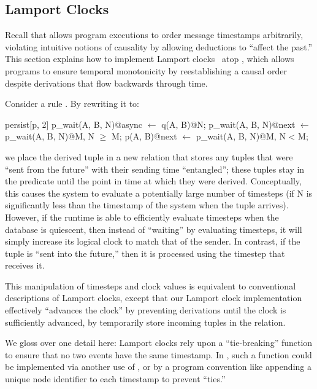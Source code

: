 \subsection{Lamport Clocks}
\label{sec:lamport}

Recall that \lang allows program executions to order message timestamps arbitrarily, violating intuitive notions of causality by allowing deductions to ``affect the past.''
This section explains how to implement Lamport
clocks~\cite{timeclocks} atop \lang, which allows programs to ensure
temporal monotonicity by reestablishing a causal order
despite derivations that flow backwards through time.

Consider a rule .  By
rewriting it to:

\begin{Dedalus}
persist[p, 2]
p\_wait(A, B, N)@async \(\leftarrow\) q(A, B)@N;
p\_wait(A, B, N)@next \(\leftarrow\) p\_wait(A, B, N)@M, N \(\ge\) M;
p(A, B)@next \(\leftarrow\) p\_wait(A, B, N)@M, N < M;
\end{Dedalus}
\noindent
we place the derived tuple in a new relation  that
stores any tuples that were ``sent from the future'' with their sending time ``entangled''; these tuples stay in the  predicate  until the point in
time at which they were derived.  Conceptually, this causes the system
to evaluate a potentially large number of timesteps (if N is
significantly less than the timestamp of the system when the tuple
arrives).  However, if the runtime is able to efficiently evaluate
timesteps when the database is quiescent, then
instead of ``waiting'' by evaluating timesteps, it will simply
increase its logical clock to match that of the sender.  In contrast,
if the tuple is ``sent into the future,'' then it is processed using
the timestep that receives it.

This manipulation of timesteps and clock values is equivalent to
conventional descriptions of Lamport clocks, except that our Lamport
clock implementation effectively ``advances the clock'' by preventing derivations until the clock is sufficiently advanced, by temporarily store incoming tuples
in the  relation.

We gloss over one detail here: Lamport clocks rely
upon a ``tie-breaking'' function to ensure that no two events have the
same timestamp.  In \lang, such a function could be implemented via another use of , or by a program convention like
appending a unique node identifier to each timestamp to prevent ``ties.''
